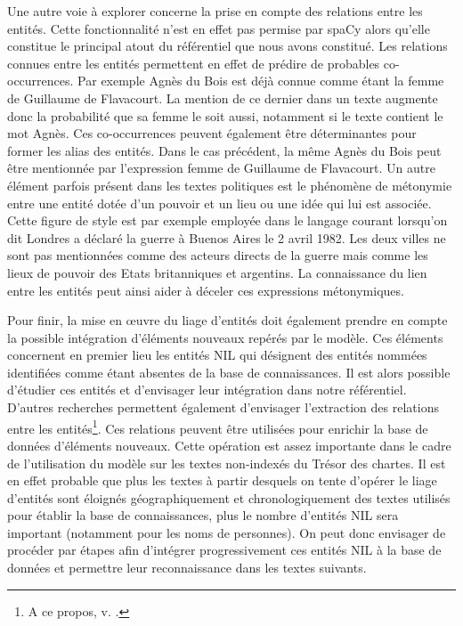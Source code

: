 \documentclass[a4paper,12pt,twoside]{book}
\begin{document}
	Une autre voie à explorer concerne la prise en compte des relations entre les entités. Cette fonctionnalité n'est en effet pas permise par spaCy alors qu'elle constitue le principal atout du référentiel que nous avons constitué. Les relations connues entre les entités permettent en effet de prédire de probables co-occurrences. Par exemple Agnès du Bois est déjà connue comme étant la femme de Guillaume de Flavacourt. La mention de ce dernier dans un texte augmente donc la probabilité que sa femme le soit aussi, notamment si le texte contient le mot \og Agnès\fg{}. Ces co-occurrences peuvent également être déterminantes pour former les alias des entités. Dans le cas précédent, la même Agnès du Bois peut être mentionnée par l'expression \og femme de Guillaume de Flavacourt\fg{}. Un autre élément parfois présent dans les textes politiques est le phénomène de métonymie entre une entité dotée d'un pouvoir et un lieu ou une idée qui lui est associée. Cette figure de style est par exemple employée dans le langage courant lorsqu'on dit \og Londres a déclaré la guerre à Buenos Aires le 2 avril 1982\fg{}. Les deux villes ne sont pas mentionnées comme des acteurs directs de la guerre mais comme les lieux de pouvoir des Etats britanniques et argentins. La connaissance du lien entre les entités peut ainsi aider à déceler ces expressions métonymiques. 
	
	Pour finir, la mise en œuvre du liage d'entités doit également prendre en compte la possible intégration d'éléments nouveaux repérés par le modèle. Ces éléments concernent en premier lieu les entités NIL qui désignent des entités nommées identifiées comme étant absentes de la base de connaissances. Il est alors possible d'étudier ces entités et d'envisager leur intégration dans notre référentiel. D'autres recherches permettent également d'envisager l'extraction des relations entre les entités\footnote{A ce propos, v. \cite[p. 169--180]{dupont_structuration_2017}.}. Ces relations peuvent être utilisées pour enrichir la base de données d'éléments nouveaux. Cette opération est assez importante dans le cadre de l'utilisation du modèle sur les textes non-indexés du Trésor des chartes. Il est en effet probable que plus les textes à partir desquels on tente d'opérer le liage d'entités sont éloignés géographiquement et chronologiquement des textes utilisés pour établir la base de connaissances, plus le nombre d'entités NIL sera important (notamment pour les noms de personnes). On peut donc envisager de procéder par étapes afin d'intégrer progressivement ces entités NIL à la base de données et permettre leur reconnaissance dans les textes suivants.
	
\end{document}
